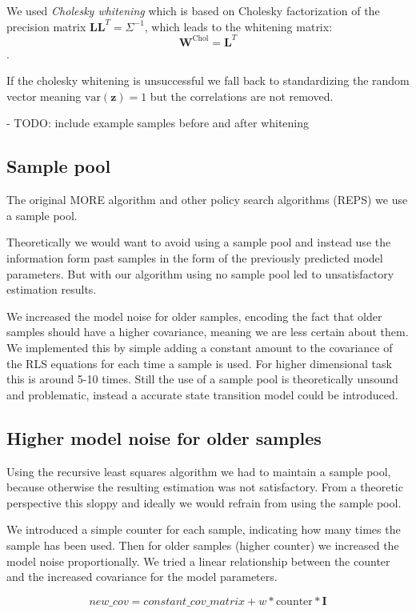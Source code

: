 We used \textit{Cholesky whitening} which is based on
Cholesky factorization of the precision matrix
$\mathbf{L}\mathbf{L}^T = \Sigma^{-1}$, which leads to the whitening
matrix:
$$ \mathbf{W}^{\text{Chol}} = \mathbf{L}^T $$.

If the cholesky whitening is unsuccessful we fall back to standardizing
the random vector meaning $\text{var}(\mathbf{z}) = 1$ but the correlations
are not removed.

- TODO: include example samples before and after whitening

\subsection{Sample pool}
The original MORE algorithm and other policy search algorithms (REPS) we
use a sample pool.

Theoretically  we would want to avoid using a sample pool and instead use
the information form past samples in the form of the previously predicted
model parameters. But with our algorithm using no sample pool led
to unsatisfactory estimation results.

We increased the model noise for older samples, encoding the fact that
older samples should have a higher covariance, meaning we are less
certain about them. We implemented this by simple adding a constant
amount to the covariance of the RLS equations for each time a sample is
used. For higher dimensional task this is around 5-10 times.
Still the use of a sample pool is theoretically unsound and problematic,
instead a accurate state transition model could be introduced.

\subsection{Higher model noise for older samples}
Using the recursive least squares algorithm we had to maintain a sample
pool, because otherwise the resulting estimation was not
satisfactory. From a theoretic perspective this sloppy and ideally we
would refrain from using the sample pool.

We introduced a simple counter for each sample, indicating how many times
the sample has been used.
Then for older samples (higher counter) we increased the model
noise proportionally.
We tried a linear relationship between the counter and
the increased covariance for the model parameters.

$$ new\_cov = constant\_cov\_matrix + w * \text{counter} * \mathbf{I} $$

